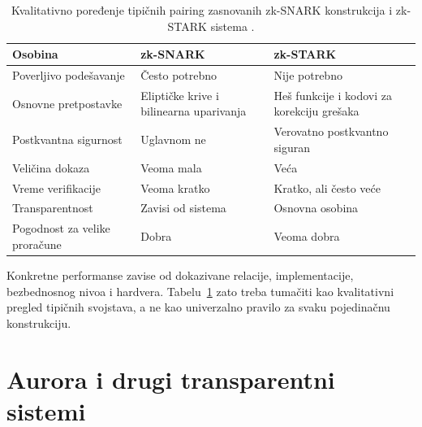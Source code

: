 \begin{table}[ht]
    \centering
    \small

    \begin{tabular}{
        |p{}
        |p{}
        |p{}|
    }
    \hline

    \textbf{Osobina}
    &
    \textbf{zk-SNARK}
    &
    \textbf{zk-STARK}
    \\
    \hline

    Poverljivo podešavanje
    &
    Često potrebno
    &
    Nije potrebno
    \\
    \hline

    Osnovne pretpostavke
    &
    Eliptičke krive i bilinearna uparivanja
    &
    Heš funkcije i kodovi za korekciju grešaka
    \\
    \hline

    Postkvantna sigurnost
    &
    Uglavnom ne
    &
    Verovatno postkvantno siguran
    \\
    \hline

    Veličina dokaza
    &
    Veoma mala
    &
    Veća
    \\
    \hline

    Vreme verifikacije
    &
    Veoma kratko
    &
    Kratko, ali često veće
    \\
    \hline

    Transparentnost
    &
    Zavisi od sistema
    &
    Osnovna osobina
    \\
    \hline

    Pogodnost za velike proračune
    &
    Dobra
    &
    Veoma dobra
    \\
    \hline

    \end{tabular}

    \caption{Kvalitativno poređenje tipičnih pairing zasnovanih zk-SNARK konstrukcija i zk-STARK sistema \cite{stark2018,aurora2019,comparison2025}.}
    \label{tab:snark-stark}
\end{table}

Konkretne performanse zavise od dokazivane relacije, implementacije,
bezbednosnog nivoa i hardvera. Tabelu~\ref{tab:snark-stark} zato treba tumačiti
kao kvalitativni pregled tipičnih svojstava, a ne kao univerzalno pravilo za
svaku pojedinačnu konstrukciju.

\section{Aurora i drugi transparentni sistemi}


